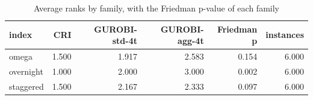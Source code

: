 \begin{table}[htbp]
\centering
\small
\caption{Average ranks by family, with the Friedman p-value of each family}
\label{tab:E7_gurobi_threads_b10_ranks_by_family}
\begin{tabular}{lrrrrr}
\toprule
index & CRI & GUROBI-std-4t & GUROBI-agg-4t & Friedman p & instances \\
\midrule
omega & 1.500 & 1.917 & 2.583 & 0.154 & 6.000 \\
overnight & 1.000 & 2.000 & 3.000 & 0.002 & 6.000 \\
staggered & 1.500 & 2.167 & 2.333 & 0.097 & 6.000 \\
\bottomrule
\end{tabular}
\end{table}
